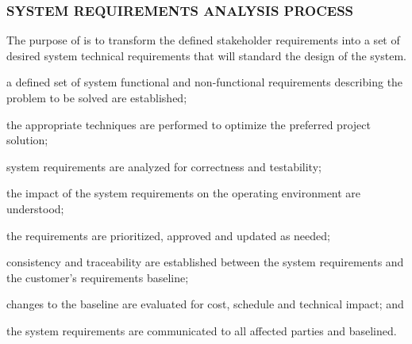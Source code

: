 		\newpage
		\subsubsection{SYSTEM REQUIREMENTS ANALYSIS PROCESS\label{proc:system_requirements_analysis_process}}

			\begin{adjustwidth}{2em}{0pt} 

				The purpose of  is to transform the defined stakeholder requirements into a set of desired system technical requirements that will standard the design of the system.

			\end{adjustwidth}

			\begin{adjustwidth}{2em}{0pt} 

				\begin{compactitem}

					\item a defined set of system functional and non-functional requirements describing the problem to be solved are established;

					\item the appropriate techniques are performed to optimize the preferred project solution;

					\item system requirements are analyzed for correctness and testability;

					\item the impact of the system requirements on the operating environment are understood;

					\item the requirements are prioritized, approved and updated as needed;

					\item consistency and traceability are established between the system requirements and the customer's requirements baseline;

					\item changes to the baseline are evaluated for cost, schedule and technical impact; and

					\item the system requirements are communicated to all affected parties and baselined.

				\end{compactitem}

			\end{adjustwidth}

